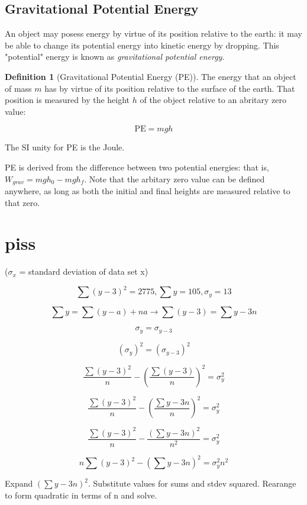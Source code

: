 \documentclass[12pt, a4paper]{article}
\theoremstyle{definition}
\newtheorem{definition}{Definition}
\begin{document}
\subsection{Gravitational Potential Energy}
An object may posess energy by virtue of its position relative to the earth: it may be able to change its potential energy into kinetic energy by dropping.
This "potential" energy is known as \emph{gravitational potential energy}.

\begin{definition}[Gravitational Potential Energy (PE)]
    The energy that an object of mass $m$ has by virtue of its position relative to the surface of the earth. That position is measured by the height $h$ of the object relative to an
    abritary zero value:

    \[\mathrm{PE} = mgh\]

    The SI unity for PE is the Joule.
\end{definition}

PE is derived from the difference between two potential energies: that is, $W_{grav} = mgh_0 - mgh_f$.
Note that the arbitary zero value can be defined anywhere, as long as both the initial and final heights are measured relative to that zero.

\section{piss}

($\sigma_x$ = standard deviation of data set x)

\[\sum (y - 3)^2 = 2775, \sum y = 105, \sigma_y = 13\]

\[\sum y = \sum(y - a) + na \rightarrow \sum (y - 3) = \sum y - 3n\]

\[\sigma_y = \sigma_{y - 3}\]

\[(\sigma_y)^2 = (\sigma_{y - 3})^2\]

\[\frac{\sum (y - 3)^2}{n} - (\frac{\sum{(y - 3)}}{n})^2 = \sigma_y^2\]

\[\frac{\sum (y - 3)^2}{n} - (\frac{\sum y - 3n}{n})^2 = \sigma_y^2\]

\[\frac{\sum (y - 3)^2}{n} - \frac{(\sum y - 3n)^2}{n^2} = \sigma_y^2\]

\[n\sum (y - 3)^2 - (\sum y - 3n)^2 = \sigma_y^2n^2\]

Expand $(\sum y - 3n)^2$. Substitute values for sums and stdev squared. Rearange to form quadratic in terms of n and solve.
\end{document}
